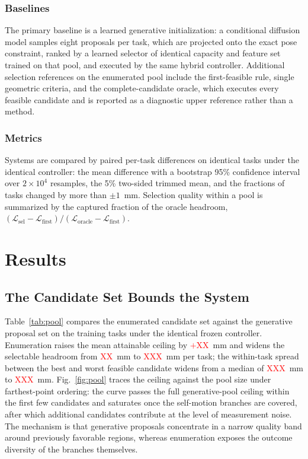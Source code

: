 \documentclass[journal]{IEEEtran}
\newcommand{\ph}[1]{\textcolor{red}{#1}}          %
\newcommand{\phOracleGap}{\ph{$+$XX}}        %
\newcommand{\phHeadroomG}{\ph{XX}}           %
\newcommand{\phHeadroomE}{\ph{XXX}}          %
\newcommand{\phSpreadG}{\ph{XXX}}            %
\newcommand{\phSpreadE}{\ph{XXX}}            %
\begin{document}
\subsubsection*{Baselines}
The primary baseline is a learned generative initialization: a
conditional diffusion model samples eight proposals per task, which are
projected onto the exact pose constraint, ranked by a learned selector of
identical capacity and feature set trained on that pool, and executed by
the same hybrid controller. Additional selection references on the
enumerated pool include the first-feasible rule, single geometric
criteria, and the complete-candidate oracle, which executes every
feasible candidate and is reported as a diagnostic upper reference rather
than a method.

\subsubsection*{Metrics}
Systems are compared by paired per-task differences on identical tasks
under the identical controller: the mean difference with a
bootstrap 95\% confidence interval over $2\times10^{4}$ resamples, the
5\% two-sided trimmed mean, and the fractions of tasks changed by more
than $\pm1$~mm. Selection quality within a pool is summarized by the
captured fraction of the oracle headroom,
$(\mathcal{L}_{\mathrm{sel}}-\mathcal{L}_{\mathrm{first}})/
 (\mathcal{L}_{\mathrm{oracle}}-\mathcal{L}_{\mathrm{first}})$.

\section{Results}
\label{sec:results}

\subsection{The Candidate Set Bounds the System}
\label{sec:res-pool}
Table~\ref{tab:pool} compares the enumerated candidate set against the
generative proposal set on the training tasks under the identical frozen
controller. Enumeration raises the mean attainable ceiling by
\phOracleGap~mm and widens the selectable headroom from \phHeadroomG~mm
to \phHeadroomE~mm per task; the within-task spread between the best and
worst feasible candidate widens from a median of \phSpreadG~mm to
\phSpreadE~mm. Fig.~\ref{fig:pool} traces the ceiling against the pool
size under farthest-point ordering: the curve passes the full
generative-pool ceiling within the first few candidates and saturates
once the self-motion branches are covered, after which additional
candidates contribute at the level of measurement noise. The mechanism
is that generative proposals concentrate in a narrow quality band around
previously favorable regions, whereas enumeration exposes the outcome
diversity of the branches themselves.
\end{document}
